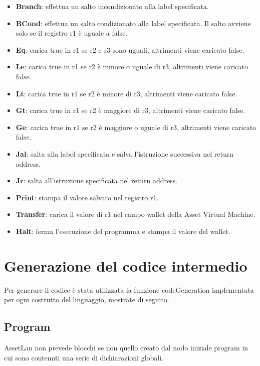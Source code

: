 \documentclass[12pt,twoside,openright,a4paper]{report}
\begin{document}
\begin{itemize}
    \item\textbf{Branch}: effettua un salto incondizionato alla label specificata.
    \item\textbf{BCond}: effettua un salto condizionato alla label specificata. Il salto avviene solo se il registro r1 è uguale a false.
    \item\textbf{Eq}: carica true in r1 se r2 e r3 sono uguali, altrimenti viene caricato false.
    \item\textbf{Le}: carica true in r1 se r2 è minore o uguale di r3, altrimenti viene caricato false.
    \item\textbf{Lt}: carica true in r1 se r2 è minore di r3, altrimenti viene caricato false.
    \item\textbf{Gt}: carica true in r1 se r2 è maggiore di r3, altrimenti viene caricato false.
    \item\textbf{Ge}: carica true in r1 se r2 è maggiore o uguale di r3, altrimenti viene caricato false.
    \item\textbf{Jal}: salta alla label specificata e salva l'istruzione successiva nel return address.
    \item\textbf{Jr}: salta all'istruzione specificata nel return address.
    \item\textbf{Print}: stampa il valore salvato nel registro r1.
    \item\textbf{Transfer}: carica il valore di r1 nel campo wallet della Asset Virtual Machine.
    \item\textbf{Halt}: ferma l'esecuzione del programma e stampa il valore del wallet.
\end{itemize}

\section{Generazione del codice intermedio}
Per generare il codice è stata utilizzata la funzione codeGeneration implementata per ogni costrutto del linguaggio, mostrate di seguito.
\subsection{Program}
AssetLan non prevede blocchi se non quello creato dal nodo iniziale program in cui sono contenuti una serie di dichiarazioni globali.
\end{document}
